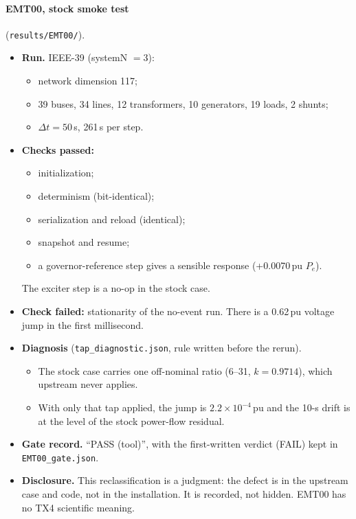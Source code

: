 \documentclass[10pt,a4paper]{article}
\newcommand{\us}{\,\textmu s}
\newcommand{\f}[1]{\nolinkurl{#1}}
\begin{document}
\paragraph{EMT00, stock smoke test} (\f{results/EMT00/}).
\begin{itemize}
\item \textbf{Run.} IEEE-39 (systemN $=3$):
  \begin{itemize}
  \item network dimension 117;
  \item 39 buses, 34 lines, 12 transformers, 10 generators, 19 loads,
    2 shunts;
  \item $\Delta t=50$\us, 261\us{} per step.
  \end{itemize}
\item \textbf{Checks passed:}
  \begin{itemize}
  \item initialization;
  \item determinism (bit-identical);
  \item serialization and reload (identical);
  \item snapshot and resume;
  \item a governor-reference step gives a sensible response (+0.0070\,pu
    $P_e$).
  \end{itemize}
  The exciter step is a no-op in the stock case.
\item \textbf{Check failed:} stationarity of the no-event run. There is a
  0.62\,pu voltage jump in the first millisecond.
\item \textbf{Diagnosis} (\f{tap_diagnostic.json}, rule written before the
  rerun).
  \begin{itemize}
  \item The stock case carries one off-nominal ratio (6--31, $k=0.9714$),
    which upstream never applies.
  \item With only that tap applied, the jump is $2.2\times10^{-4}$\,pu and the
    10-s drift is at the level of the stock power-flow residual.
  \end{itemize}
\item \textbf{Gate record.} ``PASS (tool)'', with the first-written verdict
  (FAIL) kept in \f{EMT00_gate.json}.
\item \textbf{Disclosure.} This reclassification is a judgment: the defect is
  in the upstream case and code, not in the installation. It is recorded, not
  hidden. EMT00 has no TX4 scientific meaning.
\end{itemize}
\end{document}
